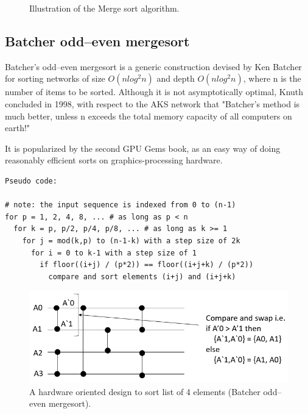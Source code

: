 \documentclass{article}
\begin{document}
\begin{figure}[H]
\centering
\caption{\label{fig:merge_serial}Illustration of the Merge sort algorithm.}
\end{figure}

\subsection{Batcher odd–even mergesort}
\label{subsec:Batcher odd–even mergesort}
Batcher's odd–even mergesort is a generic construction devised by Ken Batcher for sorting networks of size $O(nlog^2n)$ and depth $O(nlog^2n)$, where n is the number of items to be sorted\cite{wiki:001}\cite{art1}. Although it is not asymptotically optimal, Knuth concluded in 1998, with respect to the AKS network that "Batcher's method is much better, unless n exceeds the total memory capacity of all computers on earth!"

It is popularized by the second GPU Gems book, as an easy way of doing reasonably efficient sorts on graphics-processing hardware.

\begin{lstlisting}
Pseudo code:

# note: the input sequence is indexed from 0 to (n-1)
for p = 1, 2, 4, 8, ... # as long as p < n
  for k = p, p/2, p/4, p/8, ... # as long as k >= 1
    for j = mod(k,p) to (n-1-k) with a step size of 2k
      for i = 0 to k-1 with a step size of 1
        if floor((i+j) / (p*2)) == floor((i+j+k) / (p*2))
          compare and sort elements (i+j) and (i+j+k)
\end{lstlisting}

\begin{figure}[H]
\centering
\includegraphics[width=1.00\textwidth]{odd_even_nwk.PNG}
\caption{\label{fig:odd_even_nwk}A hardware oriented design to sort list of 4 elements (Batcher odd–even mergesort).}
\end{figure}
\end{document}
